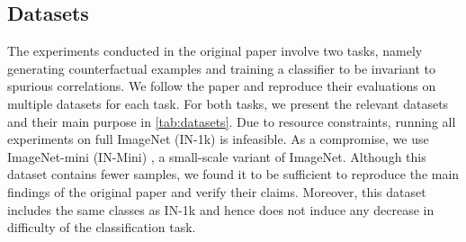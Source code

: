 \subsection{Datasets} \label{subsec:datasets}
The experiments conducted in the original paper involve two tasks, namely generating counterfactual examples and training a classifier to be invariant to spurious correlations. We follow the paper and reproduce their evaluations on multiple datasets for each task. For both tasks, we present the relevant datasets and their main purpose in \cref{tab:datasets}. Due to resource constraints, running all experiments on full ImageNet (IN-1k) is infeasible. As a compromise, we use ImageNet-mini (IN-Mini) \cite{in-mini}, a small-scale variant of ImageNet. Although this dataset contains fewer samples, we found it to be sufficient to reproduce the main findings of the original paper and verify their claims. Moreover, this dataset includes the same classes as IN-1k and hence does not induce any decrease in difficulty of the classification task.

